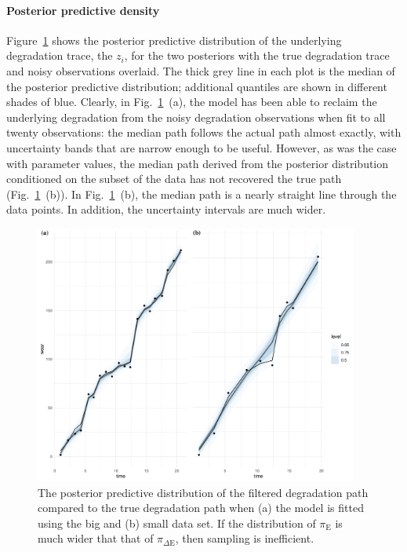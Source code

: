 \paragraph*{Posterior predictive density}
Figure~\ref{fig:ppd-z} shows the posterior predictive distribution of the underlying degradation trace, the $z_i$, for the two posteriors with the true degradation trace and noisy observations overlaid. The thick grey line in each plot is the median of the posterior predictive distribution; additional quantiles are shown in different shades of blue. Clearly, in Fig.~\ref{fig:ppd-z}~(a), the model has been able to reclaim the underlying degradation from the noisy degradation observations when fit to all twenty observations: the median path follows the actual path almost exactly, with uncertainty bands that are narrow enough to be useful. However, as was the case with parameter values, the median path derived from the posterior distribution conditioned on the subset of the data has not recovered the true path (Fig.~\ref{fig:ppd-z}~(b)). In Fig.~\ref{fig:ppd-z}~(b), the median path is a nearly straight line through the data points. In addition, the uncertainty intervals are much wider.

\begin{figure}
  \centering
  \includegraphics[width=0.95\textwidth]{./figures/ch-4/ppd_z_a.pdf}
  \caption{The posterior predictive distribution of the filtered degradation path compared to the true degradation path when (a) the model is fitted using the big and (b) small data set. If the distribution of $\pi_\text{E}$ is much wider that that of $\pi_{\Delta\text{E}}$, then sampling is inefficient.}
  \label{fig:ppd-z}
\end{figure}

